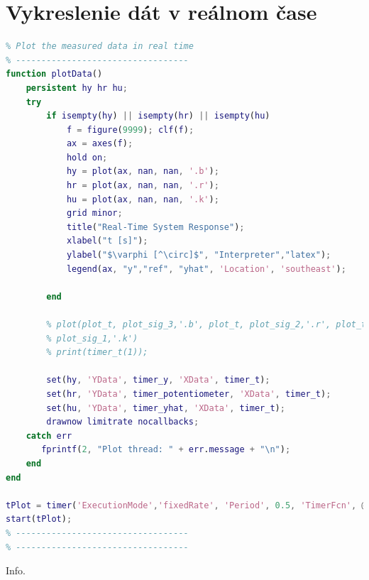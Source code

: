 \documentclass[a4paper, 10pt, ]{article}
\begin{document}
\section{Vykreslenie dát v reálnom čase}
\begin{lstlisting}[caption=Definícia časovača na vykreslenie meraných dát v reálnom čase., label={code:plot_timer}, language=Matlab]
% ----------------------------------
% Plot the measured data in real time
% ----------------------------------
function plotData()
    persistent hy hr hu;
    try
        if isempty(hy) || isempty(hr) || isempty(hu)
            f = figure(9999); clf(f);
            ax = axes(f);
            hold on;
            hy = plot(ax, nan, nan, '.b');
            hr = plot(ax, nan, nan, '.r');
            hu = plot(ax, nan, nan, '.k');
            grid minor;
            title("Real-Time System Response");
            xlabel("t [s]");
            ylabel("$\varphi [^\circ]$", "Interpreter","latex");
            legend(ax, "y","ref", "yhat", 'Location', 'southeast');
            
        end
       
        % plot(plot_t, plot_sig_3,'.b', plot_t, plot_sig_2,'.r', plot_t,
        % plot_sig_1,'.k')
        % print(timer_t(1));

        set(hy, 'YData', timer_y, 'XData', timer_t);
        set(hr, 'YData', timer_potentiometer, 'XData', timer_t);
        set(hu, 'YData', timer_yhat, 'XData', timer_t);
        drawnow limitrate nocallbacks;
    catch err
       fprintf(2, "Plot thread: " + err.message + "\n");
    end
end

tPlot = timer('ExecutionMode','fixedRate', 'Period', 0.5, 'TimerFcn', @(~, ~) plotData());
start(tPlot);
% ----------------------------------
% ----------------------------------
\end{lstlisting}

Info.
\end{document}
